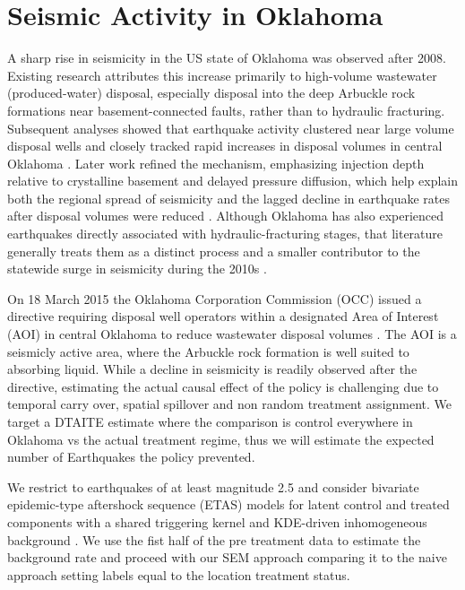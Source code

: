 %
%   

\section{Seismic Activity in Oklahoma}\label{sec:application}

A sharp rise in seismicity in the US state of Oklahoma was observed after 2008. Existing research \cite{Keranen2014,WeingartenEtAl2015} attributes this increase primarily to high-volume wastewater (produced-water) disposal, especially disposal into the deep Arbuckle rock formations near basement-connected faults, rather than to hydraulic fracturing. Subsequent analyses \citep{WalshZoback2015} showed that earthquake activity clustered near large volume disposal wells and closely tracked rapid increases in disposal volumes in central Oklahoma . Later work refined the mechanism, emphasizing injection depth relative to crystalline basement and delayed pressure diffusion, which help explain both the regional spread of seismicity and the lagged decline in earthquake rates after disposal volumes were reduced \cite{LangenbruchZoback2016,Hincks2018}. Although Oklahoma has also experienced earthquakes directly associated with hydraulic-fracturing stages, that literature generally treats them as a distinct process and a smaller contributor to the statewide surge in seismicity during the 2010s \cite{RubinsteinMahani2015,SkoumalEtAl2018}.

On 18 March 2015 the Oklahoma Corporation Commission (OCC) issued a directive requiring disposal well operators within a designated Area of Interest (AOI) in central Oklahoma to reduce wastewater disposal volumes \cite{wertz2015regulators}. The AOI is a seismicly active area, where the Arbuckle rock formation is well suited to absorbing liquid. While a decline in seismicity is readily observed after the directive, estimating the actual causal effect of the policy is challenging due to temporal carry over, spatial spillover and non random treatment assignment. We target a DTAITE estimate where the comparison is control everywhere in Oklahoma vs the actual treatment regime, thus we will estimate the expected number of Earthquakes the policy prevented.

We restrict to earthquakes of at least magnitude 2.5 and consider bivariate epidemic-type aftershock sequence (ETAS) models \cite{ogata} for latent control and treated components with a shared triggering kernel and KDE-driven inhomogeneous background \cite{nandan2017objective}. We use the fist half of the pre treatment data to estimate the background rate and proceed with our SEM approach comparing it to the naive approach setting labels equal to the location treatment status.

